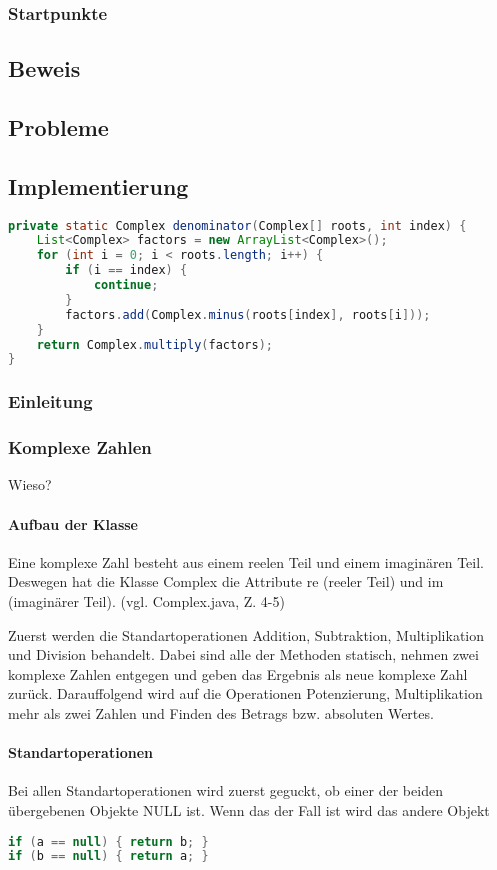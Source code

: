 \documentclass[12pt]{article}
\begin{document}
    \subsubsection{Startpunkte}
    \subsection{Beweis}
    \subsection{Probleme}
    \subsection{Implementierung}
    \begin{lstlisting}[language=Java]
private static Complex denominator(Complex[] roots, int index) {
    List<Complex> factors = new ArrayList<Complex>();
    for (int i = 0; i < roots.length; i++) {
        if (i == index) {
            continue;
        }
        factors.add(Complex.minus(roots[index], roots[i]));
    }
    return Complex.multiply(factors);
}
    \end{lstlisting}
    \subsubsection{Einleitung}
    \subsubsection{Komplexe Zahlen}
    Wieso?

    \paragraph{Aufbau der Klasse}
    Eine komplexe Zahl besteht aus einem reelen Teil und einem imaginären Teil. Deswegen hat die Klasse Complex die Attribute re (reeler Teil) und im (imaginärer Teil). 
    (vgl. Complex.java, Z. 4-5)

    Zuerst werden die Standartoperationen Addition, Subtraktion, Multiplikation und Division behandelt. Dabei sind alle der Methoden statisch, nehmen zwei komplexe Zahlen entgegen und geben das Ergebnis als neue komplexe Zahl zurück. Darauffolgend wird auf die Operationen Potenzierung, Multiplikation mehr als zwei Zahlen und Finden des Betrags bzw. absoluten Wertes. 
    \paragraph{Standartoperationen}
    Bei allen Standartoperationen wird zuerst geguckt, ob einer der beiden übergebenen Objekte NULL ist. Wenn das der Fall ist wird das andere Objekt
    \begin{lstlisting}[language=Java,title={Complex.java: Z. 20-21, 28-29, 36-37, 44-45}]
if (a == null) { return b; }
if (b == null) { return a; }
    \end{lstlisting}
\end{document}
